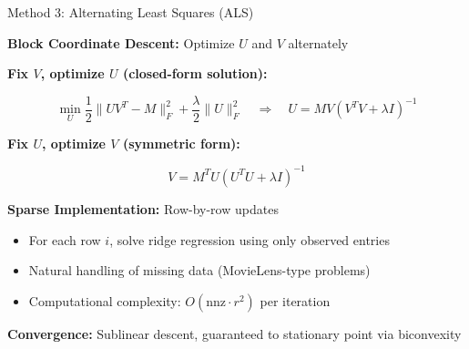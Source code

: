 \documentclass[aspectratio=169,usenames,dvipsnames]{beamer}
\begin{document}
\begin{frame}{Method 3: Alternating Least Squares (ALS)}
    
    \textbf{Block Coordinate Descent:} Optimize $U$ and $V$ alternately
    
    \vspace{0.3cm}
    
    \textbf{Fix $V$, optimize $U$ (closed-form solution):}
    
    $$\min_U \frac{1}{2}\|UV^T - M\|_F^2 + \frac{\lambda}{2}\|U\|_F^2 \quad \Rightarrow \quad 
    U = MV(V^TV + \lambda I)^{-1}$$
    
    \vspace{0.3cm}
    
    \textbf{Fix $U$, optimize $V$ (symmetric form):}
    
    $$V = M^T U(U^T U + \lambda I)^{-1}$$
    
    \vspace{0.3cm}
    
    \textbf{Sparse Implementation:} Row-by-row updates
    \begin{itemize}
        \item For each row $i$, solve ridge regression using only observed entries
        \item Natural handling of missing data (MovieLens-type problems)
        \item Computational complexity: $O(\text{nnz} \cdot r^2)$ per iteration
    \end{itemize}
    
    \vspace{0.3cm}
    
    \textbf{Convergence:} Sublinear descent, guaranteed to stationary point via biconvexity
\end{frame}
\end{document}
